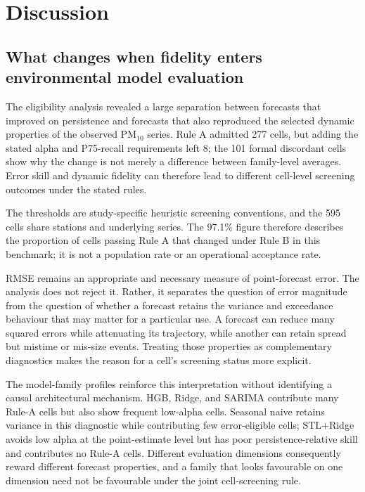 \section{Discussion}
\label{sec:discussion}

\subsection{What changes when fidelity enters environmental model evaluation}

The eligibility analysis revealed a large separation between forecasts that
improved on persistence and forecasts that also reproduced the selected
dynamic properties of the observed PM$_{10}$ series. Rule A admitted 277
cells, but adding the stated alpha and P75-recall requirements left 8; the
101 formal discordant cells show why the change is not merely a difference
between family-level averages. Error skill and dynamic fidelity can therefore
lead to different cell-level screening outcomes under the stated rules.

The thresholds are study-specific heuristic screening conventions, and the
595 cells share stations and underlying series. The 97.1\% figure therefore
describes the proportion of cells passing Rule A that changed under Rule B in
this benchmark; it is not a population rate or an operational acceptance
rate.

RMSE remains an appropriate and necessary measure of point-forecast error.
The analysis does not reject it. Rather, it separates the question of error
magnitude from the question of whether a forecast retains the variance and
exceedance behaviour that may matter for a particular use. A forecast can
reduce many squared errors while attenuating its trajectory, while another
can retain spread but mistime or mis-size events. Treating those properties
as complementary diagnostics makes the reason for a cell's screening status
more explicit.

The model-family profiles reinforce this interpretation without identifying
a causal architectural mechanism. HGB, Ridge, and SARIMA contribute many
Rule-A cells but also show frequent low-alpha cells. Seasonal naive retains
variance in this diagnostic while contributing few error-eligible cells;
STL+Ridge avoids low alpha at the point-estimate level but has poor
persistence-relative skill and contributes no Rule-A cells. Different
evaluation dimensions consequently reward different forecast properties,
and a family that looks favourable on one dimension need not be favourable
under the joint cell-screening rule.

